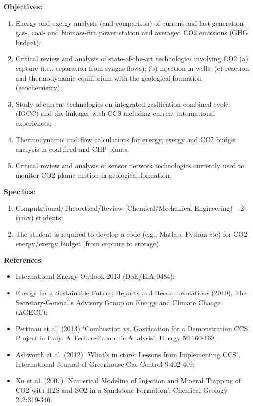 \documentclass[12pts,a4paper,amsmath,amssymb,floatfix]{article}%
\newcommand{\Chem}{Chemical/Mechanical Engineering}
\begin{document}
\begin{enumerate}[label=\bfseries Project: \arabic*:]
\noindent
{\bf Objectives:}
\begin{enumerate}
\item Energy and exergy analysis (and comparison) of current and last-generation gas-, coal- and biomass-fire power station and averaged CO2 emissions (GHG budget);
\item Critical review and analysis of state-of-the-art technologies involving CO2 (a) capture (i.e., separation from syngas flows); (b) injection in wells; (c) reaction and thermodynamic equilibrium with the geological formation (geochemistry);
\item Study of current technologies on integrated gasification combined cycle (IGCC) and the linkages with CCS including current international experiences;
\item Thermodynamic and flow calculations for energy, exergy and CO2 budget analysis in coal-fired and CHP plants;
\item Critical review and analysis of sensor network technologies currently used to monitor CO2 plume motion in geological formation.
\end{enumerate}

\noindent
{\bf Specifics:} 
\begin{enumerate}
\item Computational/Theoretical/Review (\Chem) -- 2 (max) students;
\item The student is required to develop a code (e.g., Matlab, Python etc) for CO2-energy/exergy budget (from capture to storage).
\end{enumerate}

\noindent
{\bf References:}
\begin{itemize}
\item International Energy Outlook 2013 (DoE/EIA-0484);
\item Energy for a Sustainable Future: Reports and Recommendations (2010), The Secretary-General’s Advisory Group on Energy and Climate Change (AGECC);
\item Pettinau et al. (2013) $\lq$Combustion vs. Gasification for a Demonstration CCS Project in Italy: A Techno-Economic Analysis’, Energy 50:160-169;
\item Ashworth et al. (2012) $\lq$What’s in store: Lessons from Implementing CCS’, International Journal of Greenhouse Gas Control 9:402-409;
\item Xu et al. (2007) $\lq$Numerical Modeling of Injection and Mineral Trapping of CO2 with H2S and SO2 in a Sandstone Formation’, Chemical Geology 242:319-346.
\end{itemize}


\end{enumerate}
\end{document}
